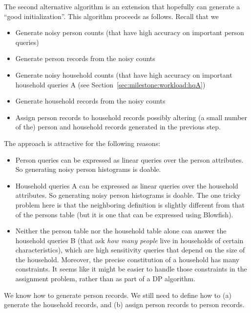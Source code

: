 \documentclass{amsart}
\begin{document}
{The second alternative algorithm is an extension that hopefully can generate a ``good initialization''. This algorithm proceeds as follows. Recall that we  
\begin{itemize}
\item Generate noisy person counts (that have high accuracy on important person queries) 
\item Generate person records from the noisy counts 
\item Generate noisy household counts (that have high accuracy on important household queries A (see Section~\ref{sec:milestone:workload:hqA})
\item Generate household records from the noisy counts
\item Assign person records to household records possibly altering (a small number of the) person and household records generated in the previous step. 
\end{itemize}

The approach is attractive for the following reasons: 
\begin{itemize}
\item Person queries can be expressed as linear queries over the person attributes. So generating noisy person histograms is doable. 
\item Household queries A can be expressed as linear queries over the household attributes. So generating noisy person histograms is doable. The one tricky problem here is that the neighboring definition is slightly different from that of the persons table (but it is one that can be expressed using Blowfish). 
\item Neither the person table nor the household table alone can answer the household queries B (that ask \emph{how many people} live in households of certain characteristics), which are high sensitivity queries that depend on the size of the household. Moreover, the precise constitution of a household has many constraints. It seems like it might be easier to handle those constraints in the assignment problem, rather than as part of a DP algorithm.    
\end{itemize}

We know how to generate person records. We still need to define how to (a) generate the household records, and (b) assign person records to person records.

}
\end{document}
